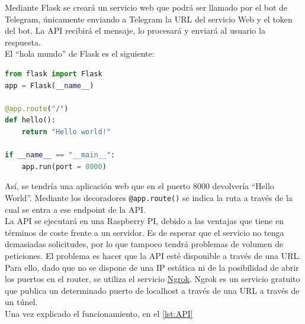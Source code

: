 Mediante Flask se creará un servicio web que podrá ser llamado por el bot de Telegram, únicamente enviando a Telegram la URL del servicio Web y el token del bot. La API recibirá el mensaje, lo procesará y enviará al usuario la respuesta.\\

El ``hola mundo'' de Flask es el siguiente:

\begin{lstlisting}[language=Python, caption= {Aplicación Web básica creada con Flask. Se crea una API que devolverá la cadena de texto \textit{Hello world!} al ser invocada. Fuente: Wikipedia}]
from flask import Flask
app = Flask(__name__)

@app.route("/")
def hello():
    return "Hello world!"

if __name__ == "__main__":
    app.run(port = 8000)
\end{lstlisting}

Así, se tendría una aplicación web que en el puerto $8000$ devolvería ``Hello World''. Mediante los decoradores \texttt{@app.route()} se indica la ruta a través de la cual se entra a ese endpoint de la API.\\

La API se ejecutará en una Raspberry PI, debido a las ventajas que tiene en términos de coste frente a un servidor. Es de esperar que el servicio no tenga demasiadas solicitudes, por lo que tampoco tendrá problemas de volumen de peticiones. El problema es hacer que la API esté disponible a través de una URL. Para ello, dado que no se dispone de una IP estática ni de la posibilidad de abrir los puertos en el router, se utiliza el servicio \href{https://ngrok.com/}{Ngrok}. Ngrok es un servicio gratuito que publica un determinado puerto de localhost a través de una URL a través de un túnel.\\

Una vez explicado el funcionamiento, en el \autoref{lst:API}

